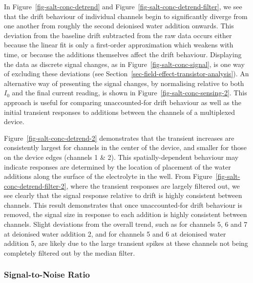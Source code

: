 \documentclass[
  a4paper,
]{scrbook}
\begin{document}
In Figure~\ref{fig-salt-conc-detrend} and
Figure~\ref{fig-salt-conc-detrend-filter}, we see that the drift
behaviour of individual channels begin to significantly diverge from one
another from roughly the second deionised water addition onwards. This
deviation from the baseline drift subtracted from the raw data occurs
either because the linear fit is only a first-order approximation which
weakens with time, or because the additions themselves affect the drift
behaviour. Displaying the data as discrete signal changes, as in
Figure~\ref{fig-salt-conc-signal}, is one way of excluding these
deviations (see Section~\ref{sec-field-effect-transistor-analysis}). An
alternative way of presenting the signal changes, by normalising
relative to both \(I_{0}\) and the final current reading, is shown in
Figure~\ref{fig-salt-conc-sensing-2}. This approach is useful for
comparing unaccounted-for drift behaviour as well as the initial
transient responses to additions between the channels of a multiplexed
device.

Figure~\ref{fig-salt-conc-detrend-2} demonstrates that the transient
increases are consistently largest for channels in the center of the
device, and smaller for those on the device edges (channels 1 \& 2).
This spatially-dependent behaviour may indicate responses are determined
by the location of placement of the water additions along the surface of
the electrolyte in the well. From
Figure~\ref{fig-salt-conc-detrend-filter-2}, where the transient
responses are largely filtered out, we see clearly that the signal
response relative to drift is highly consistent between channels. This
result demonstrates that once unaccounted-for drift behaviour is
removed, the signal size in response to each addition is highly
consistent between channels. Slight deviations from the overall trend,
such as for channels 5, 6 and 7 at deionised water addition 2, and for
channels 5 and 6 at deionised water addition 5, are likely due to the
large transient spikes at these channels not being completely filtered
out by the median filter.

\hypertarget{signal-to-noise-ratio}{%
\subsubsection*{Signal-to-Noise Ratio}\label{signal-to-noise-ratio}}
\end{document}
